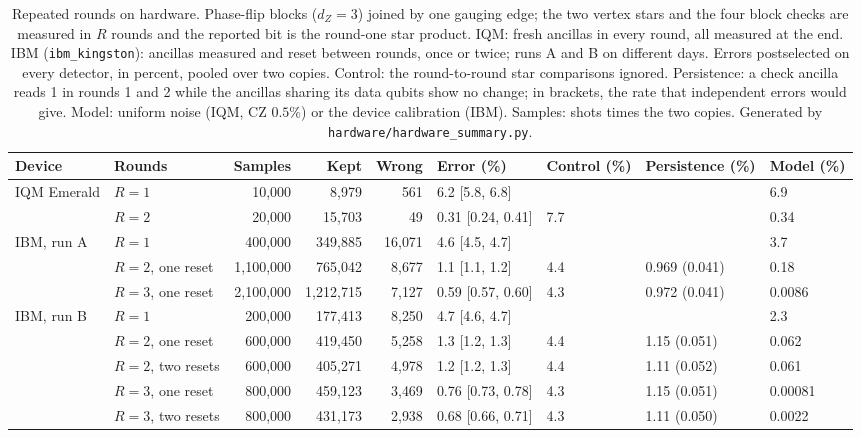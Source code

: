 \begin{table}[t]
\caption{Repeated rounds on hardware.  Phase-flip blocks ($d_Z=3$) joined by one gauging edge; the two vertex stars and the four block checks are measured in $R$ rounds and the reported bit is the round-one star product.  IQM: fresh ancillas in every round, all measured at the end.  IBM (\texttt{ibm\_kingston}): ancillas measured and reset between rounds, once or twice; runs A and B on different days.  Errors postselected on every detector, in percent, pooled over two copies.  Control: the round-to-round star comparisons ignored.  Persistence: a check ancilla reads 1 in rounds 1 and 2 while the ancillas sharing its data qubits show no change; in brackets, the rate that independent errors would give.  Model: uniform noise (IQM, CZ $0.5\%$) or the device calibration (IBM).  Samples: shots times the two copies.  Generated by \texttt{hardware/hardware\_summary.py}.}
\label{tab:hardware-rounds}
\begin{ruledtabular}
\begin{tabular}{llrrrllll}
Device & Rounds & Samples & Kept & Wrong & Error (\%) & Control (\%) & Persistence (\%) & Model (\%)\\
\hline
IQM Emerald & $R=1$ & 10{,}000 & 8{,}979 & 561 & 6.2 [5.8{,} 6.8] &  &  & 6.9\\
 & $R=2$ & 20{,}000 & 15{,}703 & 49 & 0.31 [0.24{,} 0.41] & 7.7 &  & 0.34\\
\hline
IBM{,} run A & $R=1$ & 400{,}000 & 349{,}885 & 16{,}071 & 4.6 [4.5{,} 4.7] &  &  & 3.7\\
 & $R=2${,} one reset & 1{,}100{,}000 & 765{,}042 & 8{,}677 & 1.1 [1.1{,} 1.2] & 4.4 & 0.969 (0.041) & 0.18\\
 & $R=3${,} one reset & 2{,}100{,}000 & 1{,}212{,}715 & 7{,}127 & 0.59 [0.57{,} 0.60] & 4.3 & 0.972 (0.041) & 0.0086\\
\hline
IBM{,} run B & $R=1$ & 200{,}000 & 177{,}413 & 8{,}250 & 4.7 [4.6{,} 4.7] &  &  & 2.3\\
 & $R=2${,} one reset & 600{,}000 & 419{,}450 & 5{,}258 & 1.3 [1.2{,} 1.3] & 4.4 & 1.15 (0.051) & 0.062\\
 & $R=2${,} two resets & 600{,}000 & 405{,}271 & 4{,}978 & 1.2 [1.2{,} 1.3] & 4.4 & 1.11 (0.052) & 0.061\\
 & $R=3${,} one reset & 800{,}000 & 459{,}123 & 3{,}469 & 0.76 [0.73{,} 0.78] & 4.3 & 1.15 (0.051) & 0.00081\\
 & $R=3${,} two resets & 800{,}000 & 431{,}173 & 2{,}938 & 0.68 [0.66{,} 0.71] & 4.3 & 1.11 (0.050) & 0.0022\\
\end{tabular}
\end{ruledtabular}
\end{table}

